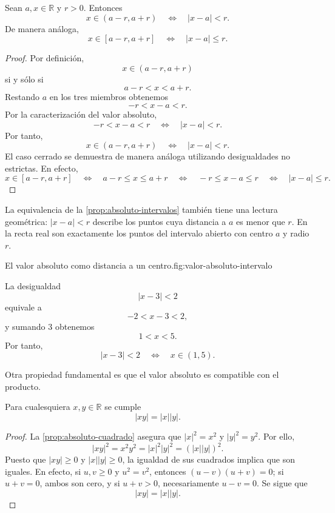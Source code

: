 \begin{samepage}
\begin{proposition}
\label{prop:absoluto-intervalos}
Sean $a,x\in\mathbb{R}$ y $r>0$. Entonces
\[
x\in(a-r,a+r)
\quad\Longleftrightarrow\quad
|x-a|<r.
\]
De manera análoga,
\[
x\in[a-r,a+r]
\quad\Longleftrightarrow\quad
|x-a|\leq r.
\]
\end{proposition}
\end{samepage}

\begin{proof}
Por definición,
\[
x\in(a-r,a+r)
\]
si y sólo si
\[
a-r<x<a+r.
\]
Restando $a$ en los tres miembros obtenemos
\[
-r<x-a<r.
\]
Por la caracterización del valor absoluto,
\[
-r<x-a<r
\quad\Longleftrightarrow\quad
|x-a|<r.
\]
Por tanto,
\[
x\in(a-r,a+r)
\quad\Longleftrightarrow\quad
|x-a|<r.
\]
El caso cerrado se demuestra de manera análoga utilizando desigualdades no estrictas.
En efecto,
\[
x\in[a-r,a+r]
\quad\Longleftrightarrow\quad
a-r\leq x\leq a+r
\quad\Longleftrightarrow\quad
-r\leq x-a\leq r
\quad\Longleftrightarrow\quad
|x-a|\leq r.
\]
\end{proof}

La equivalencia de la \cref{prop:absoluto-intervalos} también tiene una lectura geométrica: $|x-a|<r$ describe los puntos cuya distancia a $a$ es menor que $r$. En la recta real son exactamente los puntos del intervalo abierto con centro $a$ y radio $r$.

\begin{figuranotas}{El valor absoluto como distancia a un centro.}{fig:valor-absoluto-intervalo}

\end{figuranotas}

\begin{example}
La desigualdad
\[
|x-3|<2
\]
equivale a
\[
-2<x-3<2,
\]
y sumando $3$ obtenemos
\[
1<x<5.
\]
Por tanto,
\[
|x-3|<2
\quad\Longleftrightarrow\quad
x\in(1,5).
\]
\end{example}

Otra propiedad fundamental es que el valor absoluto es compatible con el producto.

\begin{samepage}
\begin{proposition}
\label{prop:absoluto-producto}
Para cualesquiera $x,y\in\mathbb{R}$ se cumple
\[
|xy|=|x||y|.
\]
\end{proposition}
\end{samepage}

\begin{proof}
La \cref{prop:absoluto-cuadrado} asegura que $|x|^2=x^2$ y $|y|^2=y^2$. Por ello,
\[
|xy|^2=x^2y^2=|x|^2|y|^2=(|x||y|)^2.
\]
Puesto que $|xy|\geq0$ y $|x||y|\geq0$, la igualdad de sus cuadrados implica que son iguales. En efecto, si $u,v\geq0$ y $u^2=v^2$, entonces $(u-v)(u+v)=0$; si $u+v=0$, ambos son cero, y si $u+v>0$, necesariamente $u-v=0$. Se sigue que
\[
|xy|=|x||y|.
\]
\end{proof}


